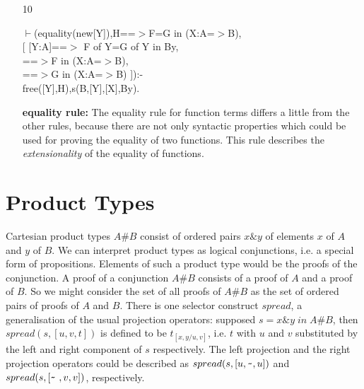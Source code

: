 \documentclass[11pt]{report}
\newcommand{\inv}[1]{\index{#1}}
\begin{document}
\begin{enumerate}
\begin{description}
 \end{description}
  
 \item[10]
\begin{sf}\begin{tabbing}
$\vdash$(equality(new[Y]),H==$>$F=G in (X:A=$>$B),\\[-0.15ex]
\hspace{2em}[ [Y:A]==$>$ F of Y=G of Y in By, \\[-0.15ex]
\hspace{3em}==$>$F in (X:A=$>$B), \\[-0.15ex]
\hspace{3em}==$>$G in (X:A=$>$B) ]):-\\[-0.15ex]
\hspace{2em}free([Y],H),s(B,[Y],[X],By).
\end{tabbing}\end{sf}

 {\bf equality rule:}
 The equality rule for function terms differs a little from 
 the other rules, because there are not only syntactic
 properties which could be used for proving the equality of
 two functions. This rule describes the \emph{extensionality}
 of the equality of functions.
  
 \end{enumerate}
  
  
 \section{Product Types}
 \inv{product type}
  
 Cartesian product types $A\#B$ consist of ordered pairs $x\&y$ of
 elements $x$ of $A$ and $y$ of $B$.
 We can interpret product types as logical conjunctions,
 i.e. a special form of propositions. Elements of such a product
 type would be the proofs of the conjunction. A proof of a conjunction
 $A\#B$ consists of a proof of $A$ and a proof of $B$.
 So we might consider the set of all proofs of $A\#B$ as the set
 of ordered pairs of proofs of $A$ and $B$. There is one selector 
 construct $spread$, a generalisation of the usual
 projection operators: supposed $s=x\&y\;in\;A\#B$, then 
 $spread(s,[u,v,t])$ is defined to be
 $t_{[x,y/u,v]}$, i.e. $t$ with $u$ and $v$ substituted by the left 
 and right component of $s$ respectively.
 The left projection and the right projection operators could be
 described as $spread(s,[u,\verb'~',u])$ and 
 $spread(s,[\verb'~'~,v,v])$, respectively.
  
\end{document}
